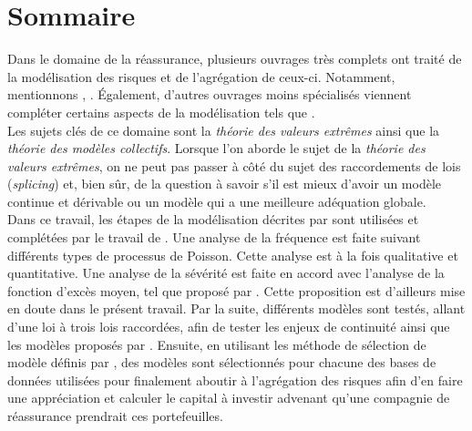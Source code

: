 \section*{Sommaire}
	Dans le domaine de la réassurance, plusieurs ouvrages très complets ont traité de la modélisation des risques et de l'agrégation de ceux-ci. Notamment, mentionnons \cite{albrecher2017reinsurance}, \cite{brazauskas2016modeling}. Également, d'autres ouvrages moins spécialisés viennent compléter certains aspects de la modélisation tels que \cite{LossModels_Klugman2012}.\\
	
	Les sujets clés de ce domaine sont la \textit{théorie des valeurs extrêmes} ainsi que la \textit{théorie des modèles collectifs}.
	Lorsque l'on aborde le sujet de la \textit{théorie des valeurs extrêmes}, on ne peut pas passer à côté du sujet des raccordements de lois (\textit{splicing}) et, bien sûr, de la question à savoir s'il est mieux d'avoir un modèle continue et dérivable ou un modèle qui a une meilleure adéquation globale.\\
	
	Dans ce travail, les étapes de la modélisation décrites par \cite{albrecher2017reinsurance} sont utilisées et complétées par le travail de \cite{LossModels_Klugman2012}.	
	Une analyse de la fréquence est faite suivant différents types de processus de Poisson. Cette analyse est à la fois qualitative et quantitative.
	Une analyse de la sévérité est faite en accord avec l'analyse de la fonction d'excès moyen, tel que proposé par \cite{Embrechts1994}. Cette proposition est d'ailleurs mise en doute dans le présent travail.
	Par la suite, différents modèles sont testés, allant d'une loi à trois lois raccordées, afin de tester les enjeux de continuité ainsi que les modèles proposés par \cite{brazauskas2016modeling}.	
	Ensuite, en utilisant les méthode de sélection de modèle définis par \cite{LossModels_Klugman2012}, des modèles sont sélectionnés pour chacune des bases de données utilisées pour finalement aboutir à l'agrégation des risques afin d'en faire une appréciation et calculer le capital à investir advenant qu'une compagnie de réassurance prendrait ces portefeuilles.	